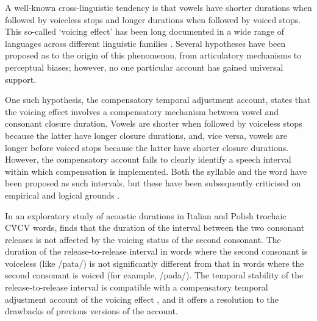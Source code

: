 \documentclass[
  12pt,
  a4paper,
  authoryear, 5p]{elsarticle}
\begin{document}
\label{s:intro}

A well-known cross-linguistic tendency is that vowels have shorter
durations when followed by voiceless stops and longer durations when
followed by voiced stops. This so-called `voicing effect' has been long
documented in a wide range of languages across different linguistic
families \citep{maddieson1976, begus2017}. Several hypotheses have been
proposed as to the origin of this phenomenon, from articulatory
mechanisms to perceptual biases; however, no one particular account has
gained universal support.

One such hypothesis, the compensatory temporal adjustment account,
states that the voicing effect involves a compensatory mechanism between
vowel and consonant closure duration. Vowels are shorter when followed
by voiceless stops because the latter have longer closure durations,
and, vice versa, vowels are longer before voiced stops because the
latter have shorter closure durations. However, the compensatory account
fails to clearly identify a speech interval within which compensation is
implemented. Both the syllable \citep{lindblom1967, farnetani1986} and
the word \citep{slis1969, slis1969a, lehiste1970a, lehiste1970} have
been proposed as such intervals, but these have been subsequently
criticised on empirical and logical grounds
\citep{chen1970, jacewicz2009, maddieson1976, coretta2018j}.

In an exploratory study of acoustic durations in Italian and Polish
trochaic CV́CV words, \citet{coretta2018j} finds that the duration of the
interval between the two consonant releases is not affected by the
voicing status of the second consonant. The duration of the
release-to-release interval in words where the second consonant is
voiceless (like /pata/) is not significantly different from that in
words where the second consonant is voiced (for example, /pada/). The
temporal stability of the release-to-release interval is compatible with
a compensatory temporal adjustment account of the voicing effect
\citep{lindblom1967, slis1969, slis1969a, lehiste1970a, lehiste1970},
and it offers a resolution to the drawbacks of previous versions of the
account.
\end{document}
